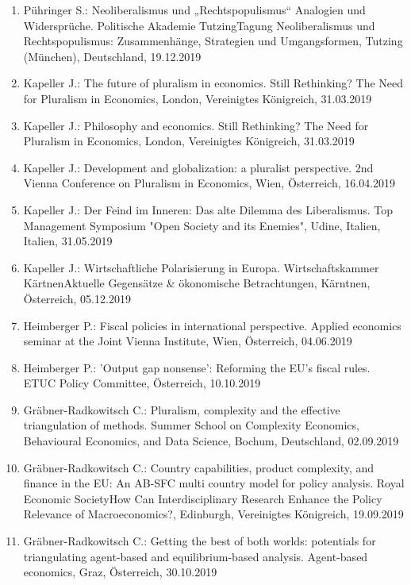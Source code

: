 \begin{enumerate}
	\item Pühringer S.: Neoliberalismus und „Rechtspopulismus“ Analogien und Widersprüche. Politische Akademie TutzingTagung Neoliberalismus und Rechtspopulismus: Zusammenhänge, Strategien und Umgangsformen, Tutzing (München), Deutschland, 19.12.2019
	\item Kapeller J.: The future of pluralism in economics. Still Rethinking? The Need for Pluralism in Economics, London, Vereinigtes Königreich, 31.03.2019
	\item Kapeller J.: Philosophy and economics. Still Rethinking? The Need for Pluralism in Economics, London, Vereinigtes Königreich, 31.03.2019
	\item Kapeller J.: Development and globalization: a pluralist perspective. 2nd Vienna Conference on Pluralism in Economics, Wien, Österreich, 16.04.2019
	\item Kapeller J.: Der Feind im Inneren: Das alte Dilemma des Liberalismus. Top Management Symposium "Open Society and its Enemies", Udine, Italien, Italien, 31.05.2019
	\item Kapeller J.: Wirtschaftliche Polarisierung in Europa. Wirtschaftskammer KärtnenAktuelle Gegensätze \& ökonomische Betrachtungen, Kärntnen, Österreich, 05.12.2019
	\item Heimberger P.: Fiscal policies in international perspective. Applied economics seminar at the Joint Vienna Institute, Wien, Österreich, 04.06.2019
	\item Heimberger P.: 'Output gap nonsense': Reforming the EU's fiscal rules. ETUC Policy Committee, Österreich, 10.10.2019
	\item Gräbner-Radkowitsch C.: Pluralism, complexity and the effective triangulation of methods. Summer School on Complexity Economics, Behavioural Economics, and Data Science, Bochum, Deutschland, 02.09.2019
	\item Gräbner-Radkowitsch C.: Country capabilities, product complexity, and finance in the EU: An AB-SFC multi country model for policy analysis. Royal Economic SocietyHow Can Interdisciplinary Research Enhance the Policy Relevance of Macroeconomics?, Edinburgh, Vereinigtes Königreich, 19.09.2019
	\item Gräbner-Radkowitsch C.: Getting the best of both worlds: potentials for triangulating agent-based and equilibrium-based analysis. Agent-based economics, Graz, Österreich, 30.10.2019
\end{enumerate}

